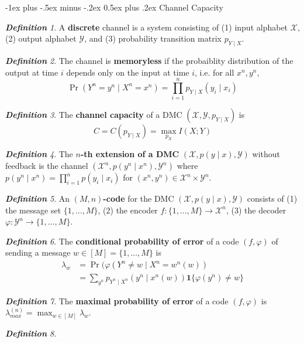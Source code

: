 \documentclass[frenchspacing,9pt,landscape,a4paper]{article}
\makeatletter
\renewcommand{\section}{\@startsection{section}{1}{0mm}%
                                {-1ex plus -.5ex minus -.2ex}%
                                {0.5ex plus .2ex}%
                                {\normalfont\large\bfseries}}
\newcommand{\mb}[1]{\mathbf #1}
\DeclareMathOperator{\pr}{Pr}
\theoremstyle{remark}
\newtheorem*{defn}{\textbf{Definition}}
\makeatother
\begin{document}
\begin{multicols}{4}
\section{Channel Capacity}
\begin{defn}
    A \textbf{discrete} channel is a system consisting of (1) input alphabet $\mathcal{X}$, (2) output
    alphabet  $\mathcal{Y}$, and (3) probability transition matrix $p_{Y\mid X}$.
\end{defn}
\begin{defn}
    The channel is \textbf{memoryless} if the probaiblity distribution of the output at time $i$ depends
    only on the input at time  $i$, i.e. for all  $x^n,y^n$,  \[\pr(Y^n=y^n\mid X^n=x^n)=\prod_{i=1}^n
    p_{Y\mid X}(y_i\mid x_i)\]
\end{defn}
\begin{defn}
    The \textbf{channel capacity} of a DMC $(\mathcal{X},\mathcal{Y},p_{Y\mid X})$ is
    \[C=C(p_{Y\mid X})=\max_{p_X} I(X;Y)\]
\end{defn}
\begin{defn}
    The \textbf{$n$-th extension of a DMC} $(\mathcal{X},p(y\mid x),\mathcal{Y})$ without feedback is the
    channel  $(\mathcal{X}^n,p(y^n\mid x^n),\mathcal{Y}^n)$ where $p(y^n\mid x^n)=\prod_{i=1}^n p(y_i\mid
    x_i)$ for  $(x^n,y^n)\in\mathcal{X}^n\times\mathcal{Y}^n$.
\end{defn}
\begin{defn}
    An \textbf{$(M,n)$-code} for the DMC $(\mathcal{X},p(y\mid x),\mathcal{Y})$ consists of (1) the message
    set  $\{1,\dots,M\}$, (2) the encoder  $f:\{1,\dots,M\}\to\mathcal{X}^n$, (3) the decoder
    $\varphi:\mathcal{Y}^n\to\{1,\dots,M\}$.
\end{defn}
\begin{defn}
    The \textbf{conditional probability of error} of a code $(f,\varphi)$ of sending a message
    $w\in[M]=\{1,\dots,M\}$ is
     \begin{align*}
         \lambda_w&=\pr(\varphi(Y^n\neq w\mid X^n=w^n(w))\\
                  &=\sum_{y^n}p_{Y^n\mid X^n}(y^n\mid x^n(w))\mb{1}\{\varphi(y^n)\neq w\}
    \end{align*}
\end{defn}
\begin{defn}
    The \textbf{maximal probability of error} of a code $(f,\varphi)$ is
    $\lambda_{max}^{(n)}=\max_{w\in[M]}\lambda_w$.
\end{defn}
\begin{defn}

\end{defn}
\end{multicols}
\end{document}
